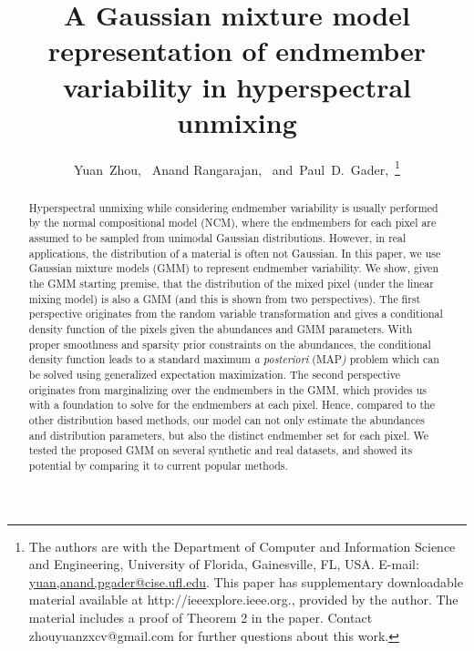 \documentclass[twocolumn,english]{IEEEtran}
\theoremstyle{plain}
\begin{document}
\title{A Gaussian mixture model representation of endmember variability
in hyperspectral unmixing}

\author{Yuan~Zhou,~ Anand Rangarajan,~
and~Paul~D.~Gader,~\thanks{The authors are with the Department of Computer and Information Science
and Engineering, University of Florida, Gainesville, FL, USA. E-mail:
\protect\href{mailto:{yuan,anand,pgader}@cise.ufl.edu}{{yuan,anand,pgader}@cise.ufl.edu}.
This paper has supplementary downloadable material available at http://ieeexplore.ieee.org.,
provided by the author. The material includes a proof of Theorem 2
in the paper. Contact zhouyuanzxcv@gmail.com for further questions
about this work.}}


\maketitle
\begin{abstract}
Hyperspectral unmixing while considering endmember variability is
usually performed by the normal compositional model (NCM), where the
endmembers for each pixel are assumed to be sampled from unimodal
Gaussian distributions. However, in real applications, the distribution
of a material is often not Gaussian. In this paper, we use Gaussian
mixture models (GMM) to represent endmember variability. We show,
given the GMM starting premise, that the distribution of the mixed
pixel (under the linear mixing model) is also a GMM (and this is shown
from two perspectives). The first perspective originates from the
random variable transformation and gives a conditional density function
of the pixels given the abundances and GMM parameters. With proper
smoothness and sparsity prior constraints on the abundances, the conditional
density function leads to a standard maximum \emph{a posteriori }(MAP\emph{)}
problem which can be solved using generalized expectation maximization.
The second perspective originates from marginalizing over the endmembers
in the GMM, which provides us with a foundation to solve for the endmembers
at each pixel. Hence, compared to the other distribution based methods,
our model can not only estimate the abundances and distribution parameters,
but also the distinct endmember set for each pixel. We tested the
proposed GMM on several synthetic and real datasets, and showed its
potential by comparing it to current popular methods.
\end{abstract}
\end{document}
